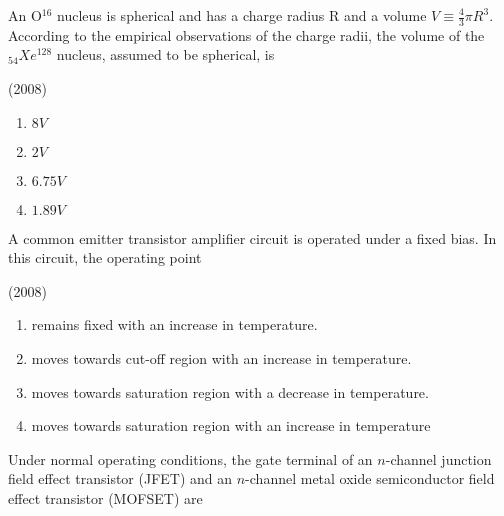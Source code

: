 \iffalse
	\chapter{2008}
	\author{AI24BTECH11003}
	\section{ph}
\fi

    \item An O$^{16}$ nucleus is spherical and has a charge radius R and a volume $V\equiv\frac{4}{3}\pi R^3$. According to the empirical observations of the charge radii, the volume of the $_{54}Xe^{128}$ nucleus, assumed to be spherical, is
    
    \hfill{(2008)}

        \begin{multicols}{4}
            \begin{enumerate}
                \item $8V$
                \item $2V$
                \item $6.75V$
                \item $1.89V$
            \end{enumerate}
        \end{multicols}

    \item A common emitter transistor amplifier circuit is operated under a fixed bias. In this circuit, the operating point
    
    \hfill{(2008)}
    
            \begin{enumerate}
                \item remains fixed with an increase in temperature.
                \item moves towards cut-off region with an increase in temperature.
                \item moves towards saturation region with a decrease in temperature.
                \item moves towards saturation region with an increase in temperature
            \end{enumerate}

    \item Under normal operating conditions, the gate terminal of an $n$-channel junction field effect transistor (JFET) and an $n$-channel metal oxide semiconductor field effect transistor (MOFSET) are
    
